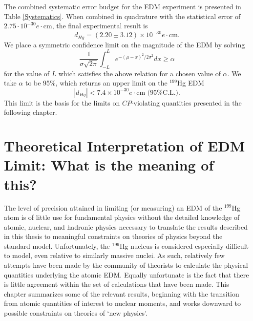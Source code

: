 \documentclass [10pt, twoside] {uwthesis}[2012/04/02]
\begin{document}
The combined systematic error budget for the EDM experiment is presented in Table \ref{Systematics}. When combined in quadrature with the statistical error of $2.75 \cdot 10^{-30} e \cdot \text{cm}$, the final experimental result is
\begin{equation}
d_{Hg} = (2.20 \pm 3.12) \times 10^{-30} e\cdot \text{cm}.
\end{equation}
We place a symmetric confidence limit on the magnitude of the EDM by solving 
\begin{equation}
\dfrac{1}{\sigma\sqrt{2\pi}}\int^L_{-L}e^{-(\mu-x)^2/2\sigma^2}dx\geq \alpha
\end{equation}
for the value of $L$ which satisfies the above relation for a chosen value of $\alpha$. We take $\alpha$ to be 95\%, which returns an upper limit on the $^{199}$Hg EDM
\begin{equation}
|d_{Hg}| < 7.4\times 10^{-30} e\cdot \text{cm} \text{ (95\% C.L.).}
\end{equation}
This limit is the basis for the limits on $CP$-violating quantities presented in the following chapter.

\chapter{Theoretical Interpretation of EDM Limit: What is the meaning of this?}	
\label{TheoryChapter}
The level of precision attained in limiting (or measuring) an EDM of the $^{199}$Hg atom is of little use for fundamental physics without the detailed knowledge of atomic, nuclear, and hadronic physics necessary to translate the results described in this thesis to meaningful constraints on theories of physics beyond the standard model. Unfortunately, the $^{199}$Hg nucleus is considered especially difficult to model, even relative to similarly massive nuclei. As such, relatively few attempts have been made by the community of theorists to calculate the physical quantities underlying the atomic EDM. Equally unfortunate is the fact that there is little agreement within the set of calculations that have been made. This chapter summarizes some of the relevant results, beginning with the transition from atomic quantities of interest to nuclear moments, and works downward to possible constraints on theories of `new physics'.
\end{document}
